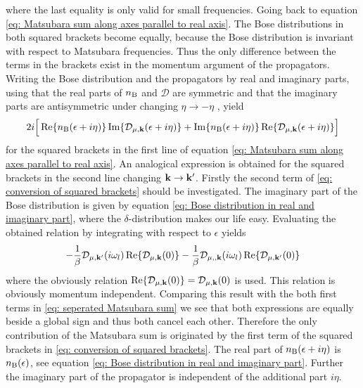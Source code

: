 %
where the last equality is only valid for small frequencies.
Going back to equation \eqref{eq: Matsubara sum along axes parallel to real axis}.
The Bose distributions in both squared brackets become equally, because the Bose distribution is invariant with respect to Matsubara frequencies.
Thus the only difference between the terms in the brackets exist in the momentum argument of the propagators.
Writing the Bose distribution and the propagators by real and imaginary parts, using that the real parts of $n_{\mathrm{B}}$ and $\mathcal{D}$ are symmetric and that the imaginary parts are antisymmetric under changing $\eta \to -\eta$ , yield
%
\begin{align}
	2i\Big[ \Re{n_{\mathrm{B}}(\epsilon+i\eta)} \Im{\mathcal{D}_{\mu, \vb{k}}(\epsilon+i\eta)} + \Im{n_{\mathrm{B}}(\epsilon+i\eta)} \Re{\mathcal{D}_{\mu, \vb{k}}(\epsilon+i\eta)} \Big]
	\label{eq: conversion of squared brackets}
\end{align}
%
for the squared brackets in the first line of equation \eqref{eq: Matsubara sum along axes parallel to real axis}.
An analogical expression is obtained for the squared brackets in the second line changing $\vb{k} \to \vb{k}'$.
Firstly the second term of \eqref{eq: conversion of squared brackets} should be investigated.
The imaginary part of the Bose distribution is given by equation \eqref{eq: Bose distribution in real and imaginary part}, where the $\delta$-distribution makes our life easy.
Evaluating the obtained relation by integrating with respect to $\epsilon$ yields
%
\begin{align}
	-\frac{1}{\beta} \mathcal{D}_{\mu,\vb{k}'}(i\omega_{l}) \Re{\mathcal{D}_{\mu,\vb{k}}(0)} - \frac{1}{\beta} \mathcal{D}_{\mu,,\vb{k}}(i\omega_{l}) \Re{\mathcal{D}_{\mu,\vb{k}'}(0)}
\end{align}
%
where the obviously relation $\Re{\mathcal{D}_{\mu,\vb{k}}(0)} = \mathcal{D}_{\mu,\vb{k}}(0)$ is used.
This relation is obviously momentum independent.
Comparing this result with the both first terms in \eqref{eq: seperated Matsubara sum} we see that both expressions are equally beside a global sign and thus both cancel each other.
Therefore the only contribution of the Matsubara sum is originated by the first term of the squared brackets in \eqref{eq: conversion of squared brackets}.
The real part of $n_{\mathrm{B}}(\epsilon + i\eta)$ is $n_{\mathrm{B}}(\epsilon)$, see equation \eqref{eq: Bose distribution in real and imaginary part}.
Further the imaginary part of the propagator is independent of the additional part $i\eta$. %
